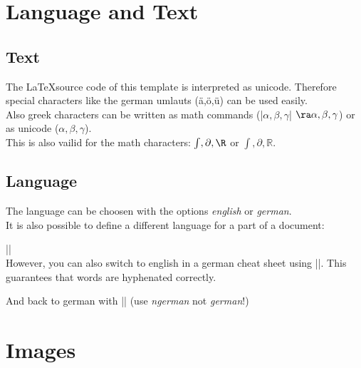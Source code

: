 \documentclass[english]{latex4ei_fs}
\begin{document}
\section{Language and Text}
\begin{sectionbox}

	\subsection{Text}
		The \LaTeX  source code of this template is interpreted as unicode. Therefore special characters like the german umlauts (ä,ö,ü) can be used easily. \\

		Also greek characters can be written as math commands (\code|$\alpha, \beta, \gamma$| $\ra \alpha, \beta, \gamma$) or as unicode ($α, β, γ$). \\

		This is also vailid for the math characters: $\int, \partial, \R$ or $∫, ∂, ℝ$.
	
\end{sectionbox}
\begin{sectionbox}
	\subsection{Language}
		The language can be choosen with the options \emph{english} or \emph{german}. \\

		It is also possible to define a different language for a part of a document:
		
		\code|| \\

		However, you can also switch to english in a german cheat sheet using \code||. This guarantees that words are hyphenated correctly.

		And back to german with \code|| (use \emph{ngerman} not \emph{german}!)
	
\end{sectionbox}

\section{Images}
\end{document}
